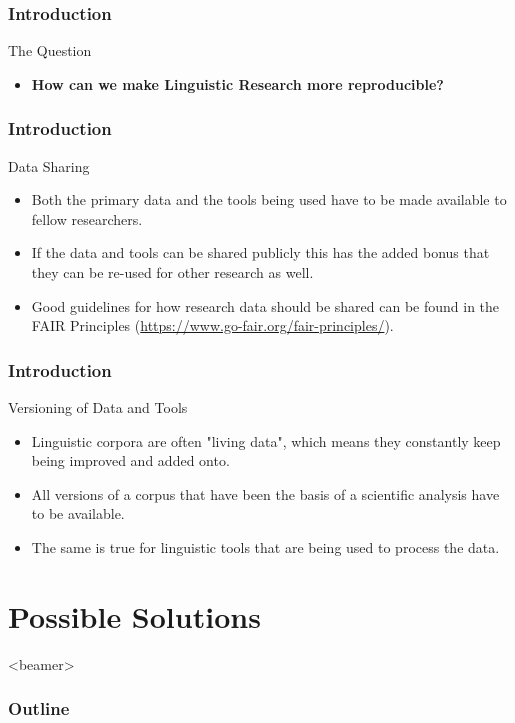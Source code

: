 \documentclass[]{beamer}
\begin{document}
	\begin{frame}
		\frametitle{Introduction}
		\begin{block}{The Question}
			\begin{itemize}
				\pause
				\bigskip
				\item \textbf{How can we make Linguistic Research more reproducible?}
				\bigskip
		   \end{itemize}
	   \end{block}
	\end{frame}

    \begin{frame}
        \frametitle{Introduction}
        \begin{block}{Data Sharing}
            \begin{itemize}
				\item Both the primary data and the tools being used have to be made available to fellow researchers.
				\pause
				\item If the data and tools can be shared publicly this has the added bonus that they can be re-used for other research as well.
				\pause
				\item Good guidelines for how research data should be shared can be found in the FAIR Principles (\url{https://www.go-fair.org/fair-principles/}).
	     	\end{itemize}
        \end{block}
    \end{frame}


	\begin{frame}
        \frametitle{Introduction}
        \begin{block}{Versioning of Data and Tools}
            \begin{itemize}
				\item Linguistic corpora are often "living data", which means they constantly keep being improved and added onto.
				\pause
				\item All versions of a corpus that have been the basis of a scientific analysis have to be available.
				\pause
				\item The same is true for linguistic tools that are being used to process the data.
	     	\end{itemize}
        \end{block}
    \end{frame}

\section[p.two]{Possible Solutions}
{%
\begin{frame}<beamer>
    \frametitle{Outline}
\tableofcontents[currentsection]
\end{frame}
}
\end{document}
